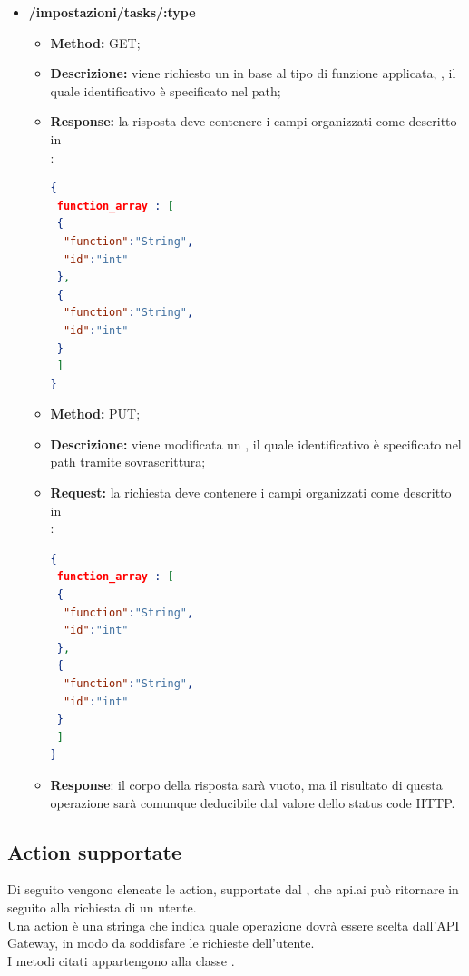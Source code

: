 \begin{itemize}
\item \textbf{/impostazioni/tasks/:type}\\

\begin{itemize}
\item \textbf{Method:} GET;
\item \textbf{Descrizione:} viene richiesto un  in base al tipo di funzione applicata, , il quale identificativo è specificato nel path;

\item \textbf{Response:} la risposta deve contenere i campi organizzati come descritto in \\:
\begin{lstlisting}[language=json,firstnumber=1]
{
 function_array : [
 {
  "function":"String",
  "id":"int"
 },
 {
  "function":"String",
  "id":"int"
 }
 ]
}
\end{lstlisting}
\end{itemize}

\begin{itemize}
\item \textbf{Method:} PUT;
\item \textbf{Descrizione:} viene modificata un , il quale identificativo è specificato nel path tramite sovrascrittura;
\item \textbf{Request:} la richiesta deve contenere i campi organizzati come descritto in \\:
\begin{lstlisting}[language=json,firstnumber=1]
{
 function_array : [
 {
  "function":"String",
  "id":"int"
 },
 {
  "function":"String",
  "id":"int"
 }
 ]
}
\end{lstlisting}
\item \textbf{Response}: il corpo della risposta sarà vuoto, ma il risultato di questa operazione sarà comunque deducibile dal valore dello status code HTTP.
\end{itemize}

\end{itemize}
\newpage
\subsection{Action supportate} \label{action}
Di seguito vengono elencate le action, supportate dal , che api.ai può ritornare in seguito alla richiesta di un utente. \\
Una action è una stringa che indica quale operazione dovrà essere scelta dall'API Gateway, in modo da soddisfare le richieste dell'utente.\\
I metodi citati appartengono alla classe .

